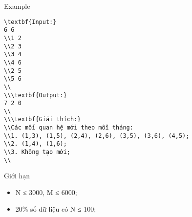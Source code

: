 Example  
\begin{verbatim}
\textbf{Input:}
6 6
\\1 2
\\2 3
\\3 4
\\4 6
\\2 5
\\5 6
\\
\\\textbf{Output:}
7 2 0
\\
\\\textbf{Giải thích:}
\\Các mối quan hệ mới theo mỗi tháng:
\\1. (1,3), (1,5), (2,4), (2,6), (3,5), (3,6), (4,5);
\\2. (1,4), (1,6);
\\3. Không tạo mới;
\\\end{verbatim}
   Giới hạn  
\begin{itemize}
	\item     N ≤ 3000, M ≤ 6000;   
	\item     20\% số dữ liệu có N ≤ 100;   
\end{itemize}
